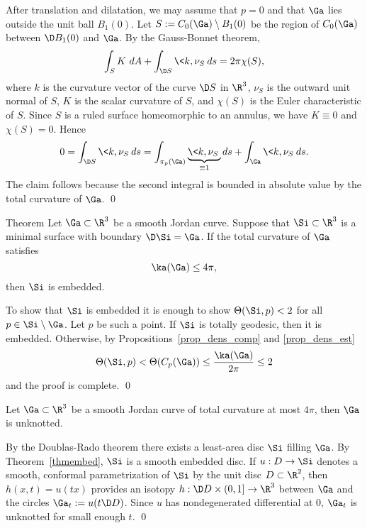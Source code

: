 \proof
After translation and dilatation, we may assume that $p=0$ and that $\Ga$ lies outside the unit ball $B_1(0)$.
Let $S:=C_0(\Ga)\setminus B_1(0)$ be the region of $C_0(\Ga)$ between $\D B_1(0)$ and $\Ga$. By the Gauss-Bonnet theorem,
\[\int_S K\ dA+\int_{\D S}\<k,\nu_S\> ds=2\pi\chi(S), \]
where $k$ is the curvature vector of the curve $\D S$ in $\R^3$, $\nu_S$ is the outward unit normal
of $S$, $K$ is the scalar curvature of $S$, and $\chi(S)$ is the Euler characteristic of $S$.
Since $S$ is a ruled surface homeomorphic to an annulus, we have $K\equiv 0$ and $\chi(S)=0$. Hence
\[0=\int_{\D S}\<k,\nu_S\> ds=\int_{\pi_p(\Ga)}\underbrace{\<k,\nu_S\>}_{\equiv 1} ds+\int_{\Ga}\<k,\nu_S\> ds.\]
The claim follows because the second integral is bounded in absolute value by the total curvature of $\Ga$.
\qed


\begin{thm}{Theorem}\label{thmembed}
Let $\Ga\subset\R^3$ be a smooth Jordan curve.
Suppose that $\Si\subset\R^3$ is a minimal surface with boundary $\D\Si=\Ga$.
If the total curvature of $\Ga$ satisfies
\[\ka(\Ga)\leq 4\pi,\]
then $\Si$ is embedded. 
\end{thm}

\proof
To show that $\Si$ is embedded it is enough to show $\Theta(\Si,p)<2$ for all $p\in\Si\setminus\Ga$.
Let $p$ be such a point.
If $\Si$ is totally geodesic, then it is embedded.
Otherwise, by Propositions~\ref{prop_dens_comp} and \ref{prop_dens_est}
\[\Theta(\Si,p)<\Theta(C_p(\Ga))\leq\frac{\ka(\Ga)}{2\pi}\leq 2\]
and the proof is complete.
\qed

Let $\Ga\subset\R^3$ be a smooth Jordan curve of total curvature at most $4\pi$, then $\Ga$ is unknotted.
\ecor

\proof
By the Doublas-Rado theorem there exists a least-area disc $\Si$ filling $\Ga$.
By Theorem~\ref{thmembed}, $\Si$ is a
smooth embedded disc. If $u:D\to\Si$ denotes a smooth, conformal parametrization of $\Si$ by the
unit disc $D\subset\R^2$, then $h(x,t)=u(tx)$ provides an isotopy $h:\D D\times(0,1]\to\R^3$ between $\Ga$
and the circles $\Ga_t:=u(t\D D)$. Since $u$ has nondegenerated differential at $0$, $\Ga_t$ is unknotted for small enough $t$.
\qed
